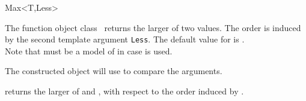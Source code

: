 \begin{ccRefFunctionObjectClass}{Max<T,Less>}

\ccDefinition

The function object class \ccRefName\ returns the larger of two values.
The order is induced by the second template argument {\tt Less}.
The default value for  is .\\

Note that  must be a model of 
in case  is used. 
 

\ccIsModel
{}

\ccCreation
{}
\ccGlue
{}
        {The constructed object will use  to compare the arguments. }

\ccOperations
{}
{returns the larger of  and , 
with respect to the order induced by . }

\end{ccRefFunctionObjectClass}
